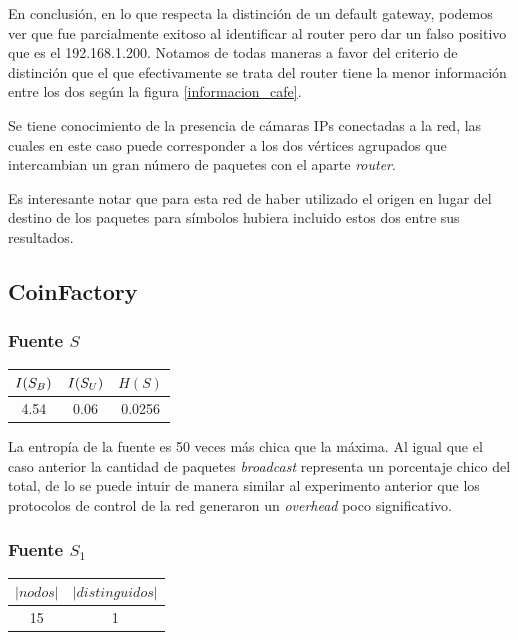 En conclusión, en lo que respecta la distinción de un default gateway, podemos ver que fue parcialmente exitoso al identificar al router pero dar un falso positivo que es el 192.168.1.200. Notamos de todas maneras a favor del criterio de distinción que el que efectivamente se trata del router tiene la menor información entre los dos según la figura \ref{informacion_cafe}.

Se tiene conocimiento de la presencia de cámaras IPs conectadas a la red, las cuales en este caso puede corresponder a los dos vértices agrupados que intercambian un gran número de paquetes con el aparte \textit{router}.

Es interesante notar que para esta red de haber utilizado el origen en lugar del destino de los paquetes para símbolos hubiera incluido estos dos entre sus resultados.


\subsection{\textbf{CoinFactory}}

\subsubsection{Fuente $S$}

\begin{center}\small
	\begin{tabular}{ c | c | c }
	  $I(S_{B})$ & $I(S_{U})$ & $H(S)$ \\
	  \hline
	  4.54 & 0.06 & 0.0256 \\
	\end{tabular}
\end{center}

La entropía de la fuente es 50 veces más chica que la máxima.
Al igual que el caso anterior la cantidad de paquetes \textit{broadcast} representa un porcentaje chico del total, de lo se puede intuir de manera similar al experimento anterior que los protocolos de control de la red generaron un \textit{overhead} poco significativo.

\medskip

\subsubsection{Fuente $S_1$}

\begin{center}\small
	\begin{tabular}{ c | c }
	  $|nodos|$ & $|distinguidos|$ \\
	  \hline
	  15 & 1 \\
	\end{tabular}
\end{center}


